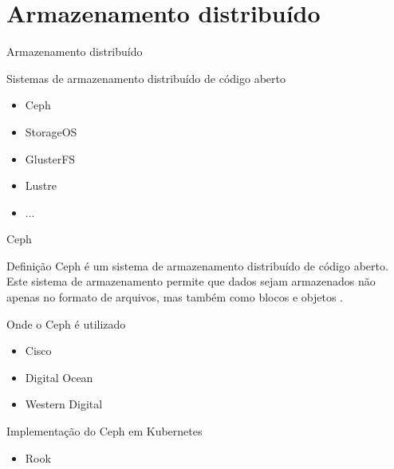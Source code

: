\documentclass{beamer}
\begin{document}

\section{Armazenamento distribuído}

\begin{frame}{Armazenamento distribuído}
    \begin{block}{Sistemas de armazenamento distribuído de código aberto}
        \begin{itemize}
            \item Ceph
            \item StorageOS
            \item GlusterFS
            \item Lustre
            \item ...
        \end{itemize}
    \end{block}
\end{frame}


\begin{frame}{Ceph}
    \begin{block}{Definição}
        Ceph é um sistema de armazenamento distribuído de código aberto. Este sistema de armazenamento permite que dados sejam armazenados não apenas no formato de arquivos, mas também como blocos e objetos \cite{cephdocumentation}.
    \end{block}
    
    \begin{block}{Onde o Ceph é utilizado}
    \begin{itemize}
        \item Cisco
        \item Digital Ocean
        \item Western Digital
    \end{itemize}
    \end{block}
    
    \begin{block}{Implementação do Ceph em Kubernetes}
    \begin{itemize}
        \item Rook
    \end{itemize}
    \end{block}
\end{frame}
\end{document}
